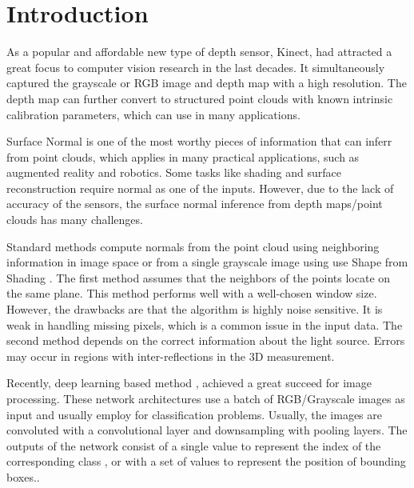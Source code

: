

\section{Introduction}
As a popular and affordable new type of depth sensor, Kinect, had attracted a great focus to computer vision research in the last decades. It simultaneously captured the grayscale or RGB image and depth map with a high resolution. The depth map can further convert to structured point clouds with known intrinsic calibration parameters, which can use in many applications.

Surface Normal is one of the most worthy pieces of information that can inferr from point clouds, which applies in many practical applications, such as augmented reality and robotics. Some tasks like shading and surface reconstruction require normal as one of the inputs. However, due to the lack of accuracy of the sensors, the  surface normal inference from depth maps/point clouds has many challenges.  




Standard methods compute normals from the point cloud using neighboring information in image space or from a single grayscale image using use Shape from Shading \cite{SFS}. The first method assumes that the neighbors of the points locate on the same plane. This method performs well with a well-chosen window size. However, the drawbacks are that the algorithm is highly noise sensitive. It is weak in handling missing pixels, which is a common issue in the input data. The second method depends on the correct information about the light source. Errors may occur in regions with inter-reflections in the 3D measurement. 

Recently, deep learning based method \cite{yolov3}, \cite{efficientDet} achieved a great succeed for image processing. 
These network architectures use a batch of RGB/Grayscale images as input and usually employ for classification problems. Usually, the images are convoluted with a convolutional layer and downsampling with pooling layers. The outputs of the network consist of a single value to represent the index of the corresponding class \cite{efficientDet}, or with a set of values to represent the position of bounding boxes.\cite{yolov3}.  


